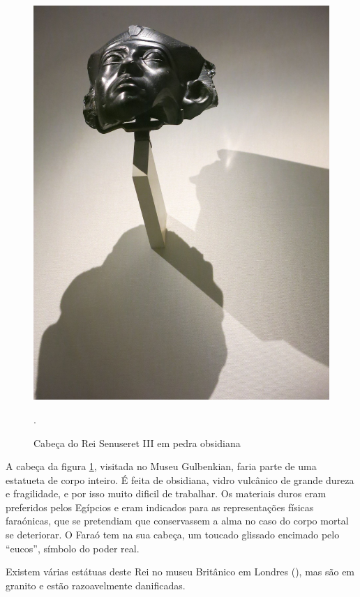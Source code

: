 \documentclass{article}
\begin{document}
\begin{figure}
\centering\includegraphics[height=0.3\textheight,keepaspectratio]
                          {senuseret.jpg}
  \caption{Cabeça do Rei Senuseret III em pedra obsidiana}.
  \label{fig:1}
\end{figure}

A cabeça da figura \ref{fig:1}, visitada no Museu Gulbenkian, faria
parte de uma estatueta de corpo inteiro. É feita de obsidiana, vidro
vulcânico de grande dureza e fragilidade, e por isso muito dificil de
trabalhar. Os materiais duros eram preferidos pelos Egípcios e eram
indicados para as representações físicas faraónicas, que se pretendiam
que conservassem a alma no caso do corpo mortal se deteriorar. O Faraó
tem na sua cabeça, um toucado glissado encimado pelo ``eucos'',
símbolo do poder real.

Existem várias estátuas deste Rei no museu Britânico em Londres
(\cite{wiki-senuseret}), mas são em granito e estão razoavelmente
danificadas.
\end{document}
